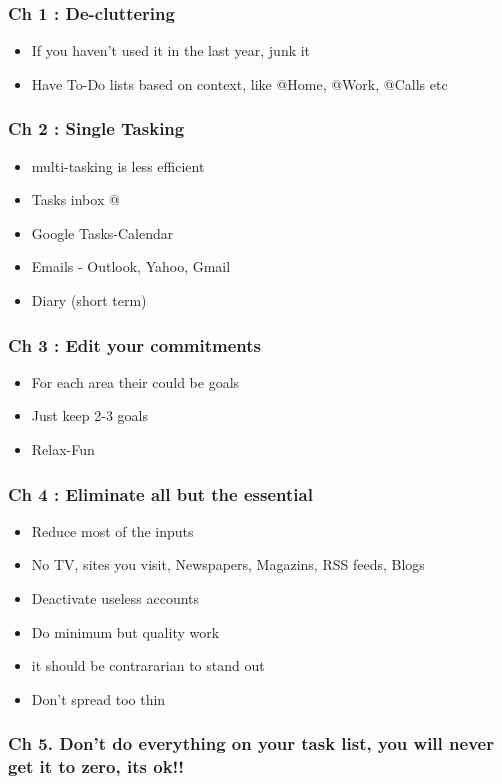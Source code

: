 \begin{frame}[fragile]
\frametitle{Ch 1 : De-cluttering}
\begin{itemize}[noitemsep,nolistsep]
\item If you haven't used it in the last year, junk it
\item Have To-Do lists based on context, like @Home, @Work, @Calls etc
\end{itemize}
\end{frame}

\begin{frame}[fragile]
\frametitle{Ch 2 : Single Tasking}
\begin{itemize}[noitemsep,nolistsep]
\item multi-tasking is less efficient
\item Tasks inbox @
\item Google Tasks-Calendar
\item Emails - Outlook, Yahoo, Gmail
\item Diary (short term)
\end{itemize}
\end{frame}

\begin{frame}[fragile]
\frametitle{Ch 3 : Edit your commitments}
\begin{itemize}[noitemsep,nolistsep]
\item For each area their could be goals
\item Just keep 2-3 goals
\item Relax-Fun
\end{itemize}
\end{frame}

\begin{frame}[fragile]
\frametitle{Ch 4 : Eliminate all but the essential}
\begin{itemize}[noitemsep,nolistsep]
\item Reduce most of the inputs
\item No TV, sites you visit, Newspapers, Magazins, RSS feeds, Blogs
\item Deactivate useless accounts
\item Do minimum but quality work
\item it should be contrararian to stand out
\item Don't spread too thin
\end{itemize}
\end{frame}

\begin{frame}[fragile]
\frametitle{Ch 5. Don't do everything on your task list, you will never get it to zero, its ok!!}
\end{frame}

